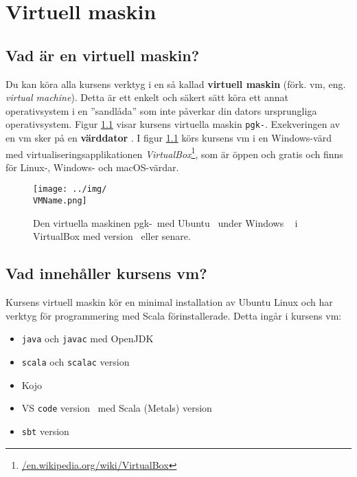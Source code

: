 
\chapter{Virtuell maskin}\label{appendix:vbox}

\section{Vad är en virtuell maskin?}

Du kan köra alla kursens verktyg i en så kallad \textbf{virtuell maskin} (förk. vm, eng. \textit{virtual machine}). 
Detta är ett enkelt och säkert sätt köra ett annat operativsystem i en ''sandlåda'' som inte påverkar din dators ursprungliga operativsystem. Figur \ref{fig:vm} visar kursens virtuella maskin \texttt{pgk-\VMName}. Exekveringen av en vm sker på en \textbf{värddator} . I figur \ref{fig:vm} körs kursens vm i en Windows-värd med virtualiseringsapplikationen \textit{VirtualBox}\footnote{\href{https://en.wikipedia.org/wiki/VirtualBox}{/en.wikipedia.org/wiki/VirtualBox}}, som är öppen och gratis och finns för Linux-, Windows- och macOS-värdar. 



\begin{figure}[H]
\centering
\texttt{[image: ../img/\\VMName.png]}
\caption{Den virtuella maskinen pgk-\VMName~med Ubuntu \UbuntuVersion~under Windows \WindowsVersion~ i VirtualBox med version \VirtualBoxVersion~eller senare.}
\label{fig:vm}
\end{figure}


\section{Vad innehåller kursens vm?}

Kursens virtuell maskin kör en minimal installation av Ubuntu Linux och har verktyg för programmering med Scala förinstallerade. Detta ingår i kursens vm:

\begin{itemize}
\item \texttt{java} och \texttt{javac} med OpenJDK \JDKVersion
\item \texttt{scala} och \texttt{scalac} version \ScalaVersion
\item Kojo \KojoVersion
\item VS \texttt{code} version \VSCodeVersion~med Scala (Metals) version \MetalsVersion
\item \texttt{sbt} version \SbtVersion
\end{itemize}

